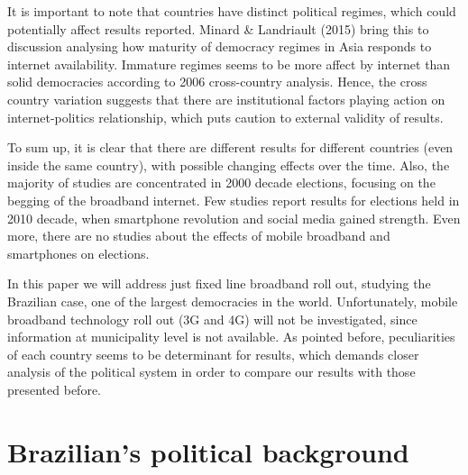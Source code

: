 \documentclass[
  12pt,
]{article}
\begin{document}
It is important to note that countries have distinct political regimes,
which could potentially affect results reported. Minard \& Landriault
(2015) bring this to discussion analysing how maturity of democracy
regimes in Asia responds to internet availability. Immature regimes
seems to be more affect by internet than solid democracies according to
2006 cross-country analysis. Hence, the cross country variation suggests
that there are institutional factors playing action on internet-politics
relationship, which puts caution to external validity of results.

To sum up, it is clear that there are different results for different
countries (even inside the same country), with possible changing effects
over the time. Also, the majority of studies are concentrated in 2000
decade elections, focusing on the begging of the broadband internet. Few
studies report results for elections held in 2010 decade, when
smartphone revolution and social media gained strength. Even more, there
are no studies about the effects of mobile broadband and smartphones on
elections.

In this paper we will address just fixed line broadband roll out,
studying the Brazilian case, one of the largest democracies in the
world. Unfortunately, mobile broadband technology roll out (3G and 4G)
will not be investigated, since information at municipality level is not
available. As pointed before, peculiarities of each country seems to be
determinant for results, which demands closer analysis of the political
system in order to compare our results with those presented before.

\hypertarget{brazilians-political-background}{%
\section{Brazilian's political
background}\label{brazilians-political-background}}
\end{document}
